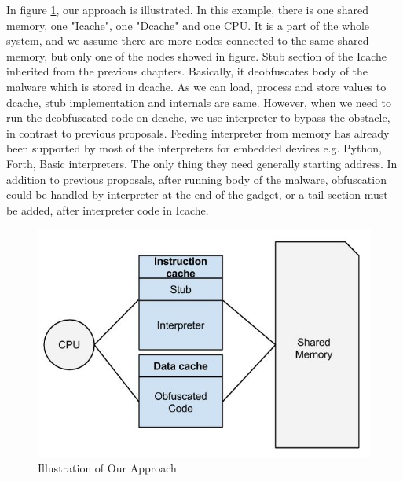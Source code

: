 	In figure \ref{fig:blockdiagram}, our approach is illustrated. In this example, there is one shared memory, one "Icache", one "Dcache" and one CPU. It is a part of the whole system, and we assume there are more nodes connected to the same shared memory, but only one of the nodes showed in figure. Stub section of the Icache inherited from the previous chapters. Basically, it deobfuscates body of the malware  which is stored in dcache. As we can load, process and store values to dcache, stub implementation and internals are same. However, when we need to run the deobfuscated code on dcache, we use interpreter to bypass the obstacle, in contrast to previous proposals. Feeding interpreter from memory has already been supported by most of the interpreters for embedded devices e.g. Python, Forth, Basic interpreters. The only thing they need generally starting address. In addition to previous proposals, after running body of the malware, obfuscation could be handled by interpreter at the end of the gadget, or a tail section must be added, after interpreter code in Icache. 
	


	\begin{figure}[h!]
	\centering
	\includegraphics[width=1\textwidth]{img/Harvard_implementation.jpg}
	\caption{Illustration of Our Approach}
	\label{fig:blockdiagram}
	\end{figure}

